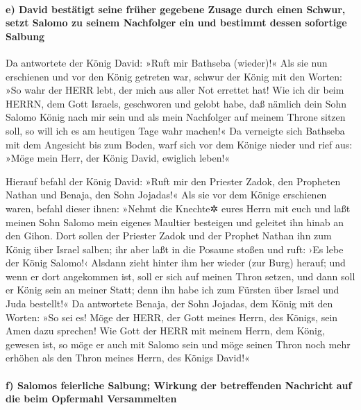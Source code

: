 \hypertarget{e-david-bestuxe4tigt-seine-fruxfcher-gegebene-zusage-durch-einen-schwur-setzt-salomo-zu-seinem-nachfolger-ein-und-bestimmt-dessen-sofortige-salbung}{%
\paragraph{e) David bestätigt seine früher gegebene Zusage durch einen
Schwur, setzt Salomo zu seinem Nachfolger ein und bestimmt dessen
sofortige
Salbung}\label{e-david-bestuxe4tigt-seine-fruxfcher-gegebene-zusage-durch-einen-schwur-setzt-salomo-zu-seinem-nachfolger-ein-und-bestimmt-dessen-sofortige-salbung}}

Da antwortete der König David: »Ruft mir Bathseba
(wieder)!« Als sie nun erschienen und vor den König getreten war,
schwur der König mit den Worten: »So wahr der HERR lebt,
der mich aus aller Not errettet hat! Wie ich dir beim
HERRN, dem Gott Israels, geschworen und gelobt habe, daß nämlich dein
Sohn Salomo König nach mir sein und als mein Nachfolger auf meinem
Throne sitzen soll, so will ich es am heutigen Tage wahr machen!«
Da verneigte sich Bathseba mit dem Angesicht bis zum
Boden, warf sich vor dem Könige nieder und rief aus: »Möge mein Herr,
der König David, ewiglich leben!«

Hierauf befahl der König David: »Ruft mir den Priester
Zadok, den Propheten Nathan und Benaja, den Sohn Jojadas!« Als sie vor
dem Könige erschienen waren, befahl dieser ihnen: »Nehmt
die Knechte✲ eures Herrn mit euch und laßt meinen Sohn Salomo mein
eigenes Maultier besteigen und geleitet ihn hinab an den Gihon.
Dort sollen der Priester Zadok und der Prophet Nathan ihn
zum König über Israel salben; ihr aber laßt in die Posaune stoßen und
ruft: ›Es lebe der König Salomo!‹ Alsdann zieht hinter
ihm her wieder (zur Burg) herauf; und wenn er dort angekommen ist, soll
er sich auf meinen Thron setzen, und dann soll er König sein an meiner
Statt; denn ihn habe ich zum Fürsten über Israel und Juda bestellt!«
Da antwortete Benaja, der Sohn Jojadas, dem König mit den
Worten: »So sei es! Möge der HERR, der Gott meines Herrn, des Königs,
sein Amen dazu sprechen! Wie Gott der HERR mit meinem
Herrn, dem König, gewesen ist, so möge er auch mit Salomo sein und möge
seinen Thron noch mehr erhöhen als den Thron meines Herrn, des Königs
David!«

\hypertarget{f-salomos-feierliche-salbung-wirkung-der-betreffenden-nachricht-auf-die-beim-opfermahl-versammelten}{%
\paragraph{f) Salomos feierliche Salbung; Wirkung der betreffenden
Nachricht auf die beim Opfermahl
Versammelten}\label{f-salomos-feierliche-salbung-wirkung-der-betreffenden-nachricht-auf-die-beim-opfermahl-versammelten}}


